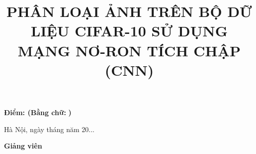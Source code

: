 \documentclass[12pt, a4paper, openany]{report}
\begin{document}
\dotfill \vspace{0.25cm} \par
\dotfill \vspace{0.25cm} \par
\dotfill \vspace{0.25cm} \par
\dotfill \vspace{0.25cm} \par
\dotfill \vspace{0.25cm} \par
\dotfill \vspace{0.25cm} \par
\dotfill \vspace{0.25cm} \par
\dotfill \vspace{0.25cm} \par
\dotfill \vspace{0.25cm} \par
\dotfill \vspace{0.25cm} \par
\dotfill
\vspace{1.0cm}

{\textbf{\large{Điểm: }}} \hspace{1.0cm}\textbf{(Bằng chữ:} \hspace{2.5cm}\textbf{)}
\vspace{1.5cm}

\begin{flushright}
	Hà Nội, ngày \hspace{0.75cm} tháng \hspace{0.75cm} năm 20...\hspace{0.75cm}
	
	{\textbf{\large{Giảng viên  }}} \hspace{2cm} \textcolor{white}{.}
\end{flushright}
\clearpage
\restoregeometry

\tableofcontents
\cleardoublepage
\listoffigures
\cleardoublepage

\title{\bfseries PHÂN LOẠI ẢNH TRÊN BỘ DỮ LIỆU CIFAR-10 SỬ DỤNG MẠNG NƠ-RON TÍCH CHẬP (CNN)}
\author{}
\date{}
\maketitle
\end{document}
